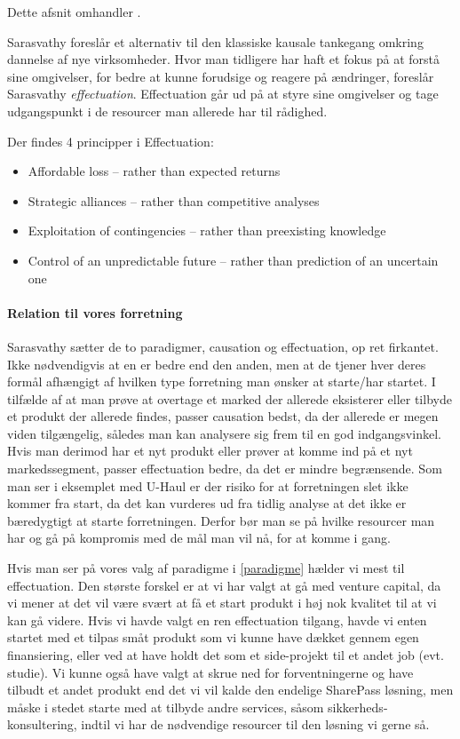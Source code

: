 
Dette afsnit omhandler \citet{sarasvathy2001effectuation}.

Sarasvathy foreslår et alternativ til den klassiske kausale tankegang omkring dannelse af nye virksomheder.
Hvor man tidligere har haft et fokus på at forstå sine omgivelser, for bedre at kunne forudsige og reagere på ændringer, foreslår Sarasvathy \textit{effectuation}.
Effectuation går ud på at styre sine omgivelser og tage udgangspunkt i de resourcer man allerede har til rådighed.

Der findes 4 principper i Effectuation:
\begin{itemize}
  \item Affordable loss -- rather than expected returns
  \item Strategic alliances -- rather than competitive analyses
  \item Exploitation of contingencies -- rather than preexisting knowledge
  \item Control of an unpredictable future -- rather than prediction of an uncertain one
\end{itemize}

\paragraph{Relation til vores forretning}
Sarasvathy sætter de to paradigmer, causation og effectuation, op ret firkantet.
Ikke nødvendigvis at en er bedre end den anden, men at de tjener hver deres formål afhængigt af hvilken type forretning man ønsker at starte/har startet.
I tilfælde af at man prøve at overtage et marked der allerede eksisterer eller tilbyde et produkt der allerede findes, passer causation bedst, da der allerede er megen viden tilgængelig, således man kan analysere sig frem til en god indgangsvinkel.
Hvis man derimod har et nyt produkt eller prøver at komme ind på et nyt markedssegment, passer effectuation bedre, da det er mindre begrænsende.
Som man ser i eksemplet med U-Haul er der risiko for at forretningen slet ikke kommer fra start, da det kan vurderes ud fra tidlig analyse at det ikke er bæredygtigt at starte forretningen.
Derfor bør man se på hvilke resourcer man har og gå på kompromis med de mål man vil nå, for at komme i gang.

Hvis man ser på vores valg af paradigme i \cref{paradigme} hælder vi mest til effectuation.
Den største forskel er at vi har valgt at gå med venture capital, da vi mener at det vil være svært at få et start produkt i høj nok kvalitet til at vi kan gå videre.
Hvis vi havde valgt en ren effectuation tilgang, havde vi enten startet med et tilpas småt produkt som vi kunne have dækket gennem egen finansiering, eller ved at have holdt det som et side-projekt til et andet job (evt. studie).
Vi kunne også have valgt at skrue ned for forventningerne og have tilbudt et andet produkt end det vi vil kalde den endelige SharePass løsning, men måske i stedet starte med at tilbyde andre services, såsom sikkerheds-konsultering, indtil vi har de nødvendige resourcer til den løsning vi gerne så.
